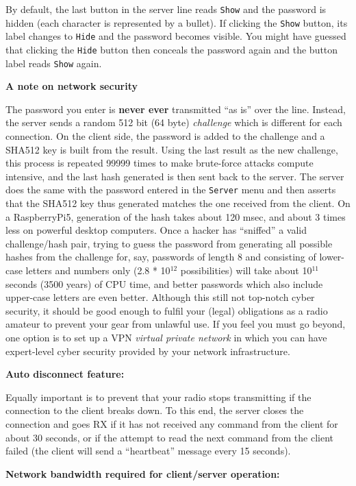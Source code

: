 \documentclass[12pt]{book}
\def\rett#1{\texttt{\color{red}#1}}
\def\bltt#1{\texttt{\color{blue}#1}}
\begin{document}
By default, the last button in
the server line reads \rett{Show} and the password is hidden (each character is represented by a bullet).
If clicking the \rett{Show} button, its label changes to \rett{Hide} and the password becomes visible. You
might have guessed that clicking the \rett{Hide} button then conceals the password again and the button
label reads \rett{Show} again.

\textbf{A note on network security}

The password you enter is \textbf{never ever} transmitted ``as is'' over the line. Instead, the server sends a random
512 bit (64 byte) \textit{challenge} which is different for each connection.
On the client side,  the password is added
to the challenge and a SHA512 key is built from the result.  Using the last result as the new challenge,
this process is repeated 99999 times to make brute-force attacks compute intensive,
and the last hash generated is then sent back to the server. The server
does the same with the password entered in the \bltt{Server} menu and then asserts
that the SHA512 key thus generated matches the one received from the client.
On a RaspberryPi5, generation of the hash takes about 120 msec, and about 3 times less on powerful desktop
computers. Once a hacker has ``sniffed'' a valid challenge/hash pair, trying to guess the password
from generating all possible hashes
from the challenge for, say, passwords of length 8 and consisting of lower-case letters and numbers only
(2.8 * 10$^{12}$ possibilities) will take about 10$^{11}$ seconds (3500 years) of CPU time, and better
passwords which also include upper-case letters are even better.
Although this still  not  top-notch cyber security, it should be good enough
to fulfil your  (legal) obligations as a radio amateur to prevent your gear from unlawful use.
If you feel you must go beyond, one option is to set up a VPN \textit{virtual private network} in which
you can have expert-level cyber security provided by your network infrastructure.

\textbf{Auto disconnect feature:}

Equally important is to prevent that your radio stops transmitting if
the connection to the client breaks down. To this end, the server closes the connection and goes RX if
it has not received any command from the client for about 30 seconds, or if the attempt to read the
next command from the client failed (the client will send a
``heartbeat'' message every 15 seconds).

\textbf{Network bandwidth required for client/server operation:}
\end{document}
